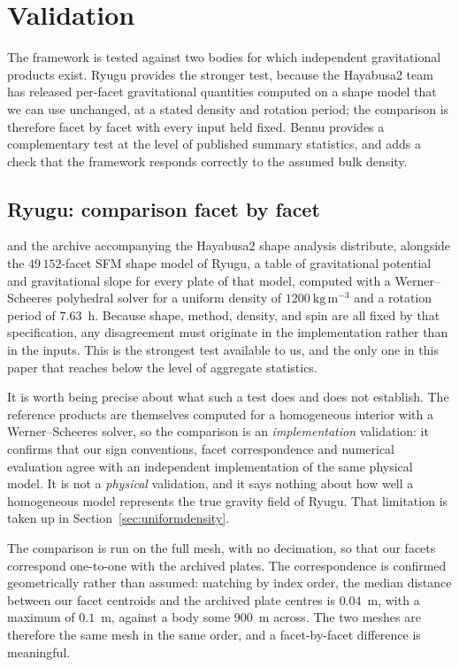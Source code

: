 \section{Validation}
\label{sec:validation}

The framework is tested against two bodies for which independent gravitational
products exist. Ryugu provides the stronger test, because the Hayabusa2 team
has released per-facet gravitational quantities computed on a shape model that
we can use unchanged, at a stated density and rotation period; the comparison
is therefore facet by facet with every input held fixed. Bennu provides a
complementary test at the level of published summary statistics, and adds a
check that the framework responds correctly to the assumed bulk density.

\subsection{Ryugu: comparison facet by facet}
\label{sec:ryugu}

\citet{kanamaru2019} and the archive accompanying the Hayabusa2 shape analysis
distribute, alongside the $49\,152$-facet SFM shape model of Ryugu, a table of
gravitational potential and gravitational slope for every plate of that model,
computed with a Werner--Scheeres polyhedral solver for a uniform density of
$1200\ \mathrm{kg\,m^{-3}}$ and a rotation period of $7.63$~h. Because shape,
method, density, and spin are all fixed by that specification, any disagreement
must originate in the implementation rather than in the inputs. This is the
strongest test available to us, and the only one in this paper that reaches
below the level of aggregate statistics.

It is worth being precise about what such a test does and does not establish.
The reference products are themselves computed for a homogeneous interior with a
Werner--Scheeres solver, so the comparison is an \emph{implementation}
validation: it confirms that our sign conventions, facet correspondence and
numerical evaluation agree with an independent implementation of the same
physical model. It is not a \emph{physical} validation, and it says nothing
about how well a homogeneous model represents the true gravity field of Ryugu.
That limitation is taken up in Section~\ref{sec:uniformdensity}.

The comparison is run on the full mesh, with no decimation, so that our facets
correspond one-to-one with the archived plates. The correspondence is confirmed
geometrically rather than assumed: matching by index order, the median distance
between our facet centroids and the archived plate centres is $0.04$~m, with a
maximum of $0.1$~m, against a body some $900$~m across. The two meshes are
therefore the same mesh in the same order, and a facet-by-facet difference is
meaningful.

